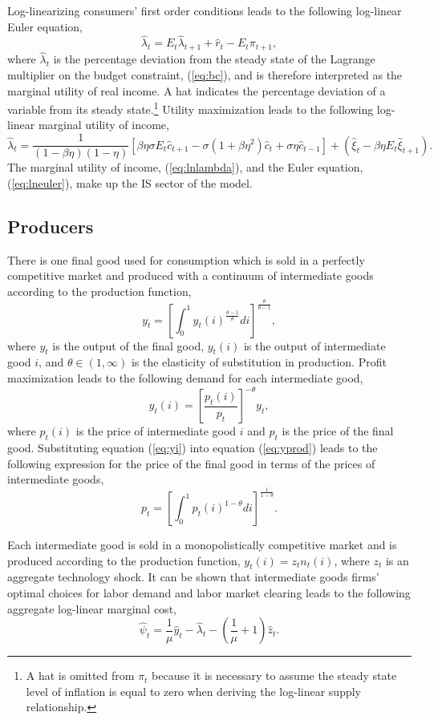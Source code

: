 \documentclass[10pt]{article}
\newcommand{\beq}{\begin{equation}}
\newcommand{\eeq}{\end{equation}}
\newcommand{\h}[1]{\hat{#1}}
\begin{document}
Log-linearizing consumers' first order conditions leads to the following log-linear Euler equation,
\beq \label{eq:lneuler} \h{\lambda}_{t} = E_t \h{\lambda}_{t+1} + \h{r}_t - E_t \pi_{t+1}, \eeq
where $\h{\lambda}_t$ is the percentage deviation from the steady state of the Lagrange multiplier on the budget constraint, (\ref{eq:bc}), and is therefore interpreted as the marginal utility of real income.  A hat indicates the percentage deviation of a variable from its steady state.\footnote{A hat is omitted from $\pi_t$ because it is necessary to assume the steady state level of inflation is equal to zero when deriving the log-linear supply relationship.}  Utility maximization leads to the following log-linear marginal utility of income,
\beq \label{eq:lnlambda} \h{\lambda}_t = \frac{1}{ (1-\beta \eta)(1-\eta)}\left[ \beta \eta \sigma E_t \h{c}_{t+1} - \sigma(1+\beta \eta^2) \h{c}_t + \sigma \eta \h{c}_{t-1} \right] + \left(\h{\xi}_t - \beta \eta E_t \h{\xi}_{t+1} \right). \eeq
The marginal utility of income, (\ref{eq:lnlambda}), and the Euler equation, (\ref{eq:lneuler}), make up the IS sector of the model.

\subsection{Producers}
There is one final good used for consumption which is sold in a perfectly competitive market and produced with a continuum of intermediate goods according to the production function,
\beq \label{eq:yprod} y_t = \left[ \int_0^1 y_t(i)^{\frac{\theta-1}{\theta}} di \right]^{\frac{\theta}{\theta-1}}, \eeq
where $y_t$ is the output of the final good, $y_t(i)$ is the output of intermediate good $i$, and $\theta\in(1,\infty)$ is the elasticity of substitution in production.  Profit maximization leads to the following demand for each intermediate good,
\beq \label{eq:yi} y_t(i) = \left[ \frac{p_t(i)}{p_t} \right]^{-\theta} y_t, \eeq
where $p_t(i)$ is the price of intermediate good $i$ and $p_t$ is the price of the final good.  Substituting equation (\ref{eq:yi}) into equation (\ref{eq:yprod}) leads to the following expression for the price of the final good in terms of the prices of intermediate goods,
\beq \label{eq:pfinal} p_t = \left[ \int_0^1 p_t(i)^{1-\theta} di \right]^{\frac{1}{1-\theta}}. \eeq

Each intermediate good is sold in a monopolistically competitive market and is produced according to the production function, $y_t(i) = z_t n_t(i)$, where $z_t$ is an aggregate technology shock.  It can be shown that intermediate goods firms' optimal choices for labor demand and labor market clearing leads to the following aggregate log-linear marginal cost,
\beq \label{eq:mc2} \h{\psi}_t = \frac{1}{\mu} \h{y}_t - \h{\lambda}_t - \left(\frac{1}{\mu} + 1\right) \h{z}_t. \eeq
\end{document}
